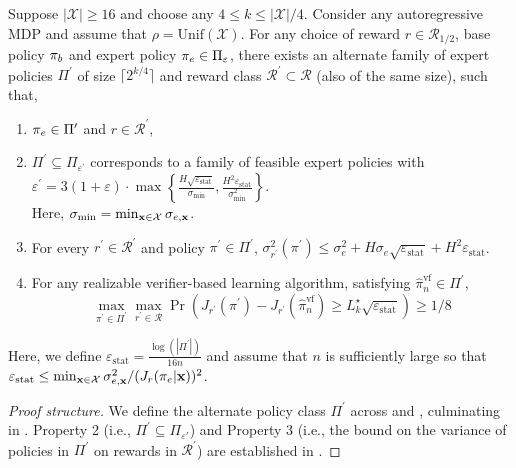 \begin{theorem}
Suppose $|\mathcal{X}| \ge 16$ and choose any $4 \le k \le |\mathcal{X}|/4$. Consider any autoregressive MDP and assume that $\rho = \text{Unif} (\mathcal{X})$. For any choice of reward $r \in \mathcal{R}_{1/2}$, base policy $\pi_b$ and expert policy $\pi_e \in \Pi_\varepsilon$, there exists an alternate family of expert policies $\Pi^\prime$ of size $\lceil 2^{k/4} \rceil$ and reward class $\mathcal{R}^\prime \subset \mathcal{R}$ (also of the same size), such that,
\begin{enumerate}
    \item $\pi_e \in \Pi^\prime$ and $r \in \mathcal{R}^\prime$,
    \item $\Pi^\prime \subseteq \Pi_{\varepsilon^\prime}$ corresponds to a family of feasible expert policies with $\varepsilon^\prime = 3(1+\varepsilon) \cdot \max \left\{ \frac{H\sqrt{\varepsilon_{\text{stat}}}}{\sigma_{\min}}, \frac{H^2 \varepsilon_{\text{stat}}}{\sigma_{\min}^2} \right\}$.\\
    Here, $\sigma_{\min} = \min_{\mathbf{x} \in \mathcal{X}} \sigma_{e,\mathbf{x}}$.
    \item For every $r^\prime \in \mathcal{R}^\prime$ and policy $\pi^\prime \in \Pi^\prime$, $\sigma_{r^\prime}^2 (\pi^\prime) \le \sigma_e^2 + H \sigma_e \sqrt{\varepsilon_{\text{stat}}} + H^2 \varepsilon_{\text{stat}}$.
    \item For any realizable verifier-based learning algorithm, satisfying $\hat{\pi}^{\text{vf}}_n \in \Pi^\prime$,
    \begin{equation}
    \max_{\pi^\prime \in \Pi^\prime} \max_{r^\prime \in \mathcal{R}} \Pr \left( J_{r^\prime} (\pi^\prime) - J_{r^\prime} (\hat{\pi}^{\text{vf}}_n) \ge L_k^\star\sqrt{\varepsilon_{\text{stat}}} \right) \ge 1/8
\end{equation}
\end{enumerate}
Here, we define $\varepsilon_{\text{stat}} = \frac{\log(|\Pi^\prime|)}{16n}$ and assume that $n$ is sufficiently large so that $\varepsilon_{\text{stat}} \le \min_{\mathbf{x} \in \mathcal{X}} \sigma_{e,\mathbf{x}}^2 / (J_r(\pi_e|\mathbf{x}))^2$. 
\end{theorem}

\begin{proof}[Proof structure]
We define the alternate policy class $\Pi^\prime$ across  and , culminating in . Property 2 (i.e., $\Pi^\prime \subseteq \Pi_{\varepsilon'}$) and Property 3 (i.e., the bound on the variance of policies in $\Pi^\prime$ on rewards in $\mathcal{R}^\prime$) are established in .
\end{proof}

